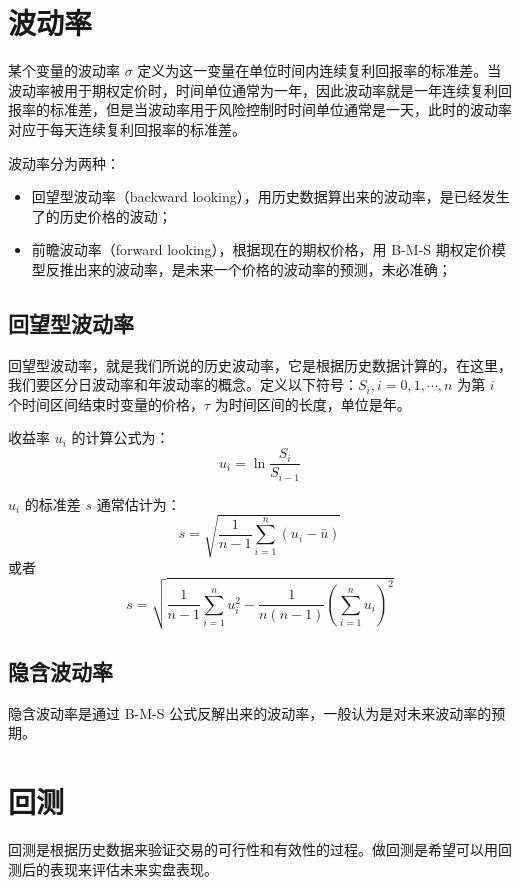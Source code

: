\documentclass{article}
\begin{document}
\section{波动率}
某个变量的波动率 $\sigma$ 定义为这一变量在单位时间内连续复利回报率的标准差。当波动率被用于期权定价时，时间单位通常为一年，因此波动率就是一年连续复利回报率的标准差，但是当波动率用于风险控制时时间单位通常是一天，此时的波动率对应于每天连续复利回报率的标准差。

波动率分为两种：
\begin{itemize}
    \item 回望型波动率（backward looking），用历史数据算出来的波动率，是已经发生了的历史价格的波动；
    \item 前瞻波动率（forward looking），根据现在的期权价格，用 B-M-S 期权定价模型反推出来的波动率，是未来一个价格的波动率的预测，未必准确；
\end{itemize}
\subsection{回望型波动率}
回望型波动率，就是我们所说的历史波动率，它是根据历史数据计算的，在这里，我们要区分日波动率和年波动率的概念。定义以下符号：$S_i, i=0,1,\cdots,n$ 为第 $i$ 个时间区间结束时变量的价格，$\tau$ 为时间区间的长度，单位是年。

收益率 $u_i$ 的计算公式为：
\begin{equation}
    u_i=\ln\frac{S_i}{S_{i-1}}
\end{equation}

$u_i$ 的标准差 $s$ 通常估计为：
$$s=\sqrt{\frac{1}{n-1}\sum_{i=1}^{n}(u_i-\bar{u})}$$
或者
$$s=\sqrt{\frac{1}{n-1}\sum_{i=1}^{n}u_i^2-\frac{1}{n(n-1)}(\sum_{i=1}^{n}u_i)^2}$$

\subsection{隐含波动率}
隐含波动率是通过 B-M-S 公式反解出来的波动率，一般认为是对未来波动率的预期。

\section{回测}
回测是根据历史数据来验证交易的可行性和有效性的过程。做回测是希望可以用回测后的表现来评估未来实盘表现。
\end{document}
